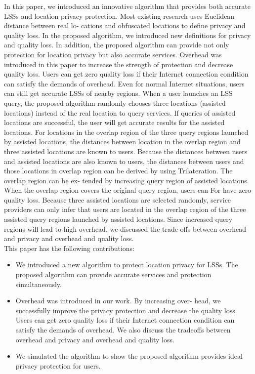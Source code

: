 \documentclass[a4paper,fleqn]{cas-dc}
\begin{document}
In this paper, we introduced an innovative algorithm that provides both accurate LSSs and location privacy protection. Most existing research uses Euclidean distance between real lo- cations and obfuscated locations to define privacy and quality loss. In the proposed algorithm, we introduced new definitions for privacy and quality loss. In addition, the proposed algorithm can provide not only protection for location privacy but also accurate services. Overhead was introduced in this paper to increase the strength of protection and decrease quality loss. Users can get zero quality loss if their Internet connection condition can satisfy the demands of overhead. Even for normal Internet situations, users can still get accurate LSSs of nearby regions. When a user launches an LSS query, the proposed algorithm randomly chooses three locations (assisted locations) instead of the real location to query services. If queries of assisted locations are successful, the user will get accurate results for the assisted locations. For locations in the overlap region of the three query regions launched by assisted locations, the distances between location in the overlap region and three assisted locations are known to users. Because the distances between users and assisted locations are also known to users, the distances between users and those locations in overlap region can be derived by using Trilateration. The overlap region can be ex- tended by increasing query region of assisted locations. When the overlap region covers the original query region, users can
For have zero quality loss. Because three assisted locations are selected randomly, service providers can only infer that users are located in the overlap region of the three assisted query regions launched by assisted locations. Since increased query regions will lead to high overhead, we discussed the trade-offs between overhead and privacy and overhead and quality loss.\\

This paper has the following contributions:





\begin{itemize} 
\item We introduced a new algorithm to protect location privacy for LSSs. The proposed algorithm can provide accurate services and protection simultaneously.

\item Overhead was introduced in our work. By increasing over- head, we successfully improve the privacy protection and decrease the quality loss. Users can get zero quality loss if their Internet connection condition can satisfy the demands of overhead. We also discuss the tradeoffs between overhead and privacy and overhead and quality loss. 

\item We simulated the algorithm to show the proposed algorithm provides ideal privacy protection for users.

\end{itemize}
\end{document}
